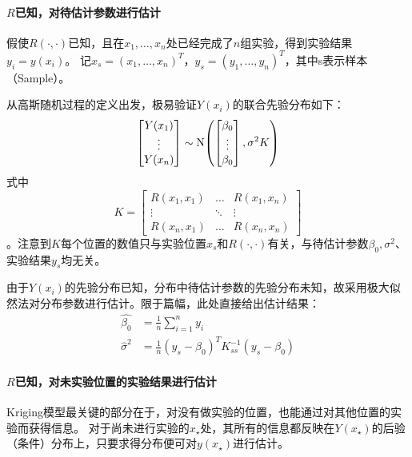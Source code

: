\documentclass[index]{subfiles}
\begin{document}
\paragraph{$R$已知，对待估计参数进行估计}
假使$R(\cdot, \cdot)$已知，且在$x_1,\ldots,x_n$处已经完成了$n$组实验，得到实验结果$y_i=y(x_i)$。
记$x_s=(x_1,\ldots,x_n)^T$，$y_s=(y_1,\ldots,y_n)^{T}$，其中s表示样本（Sample）。

从高斯随机过程的定义出发，极易验证$Y(x_i)$的联合先验分布如下：
\begin{equation}\label{equ:doe-kss-d}
  \begin{bmatrix} Y(x_1) \\ \vdots \\ Y(x_n) \end{bmatrix}
  \sim \operatorname{N}\!\left(
    \begin{bmatrix} \beta_0 \\ \vdots \\ \beta_0 \end{bmatrix}
  ,\sigma^2 K \right)
\end{equation}
式中
\begin{equation}\label{equ:doe-kss}
  K = \begin{bmatrix}
    R(x_1, x_1) & \ldots & R(x_1, x_n) \\
    \vdots & \ddots & \vdots \\
    R(x_n, x_1) & \ldots & R(x_n, x_n)
  \end{bmatrix}
\end{equation}
。注意到$K$每个位置的数值只与实验位置$x_s$和$R(\cdot, \cdot)$有关，与待估计参数$\beta_0,\sigma^2$、实验结果$y_s$均无关。

由于$Y(x_i)$的先验分布已知，分布中待估计参数的先验分布未知，故采用极大似然法对分布参数进行估计。限于篇幅，此处直接给出估计结果\cite{sacks1989}：
\begin{align}\label{equ:doe-par-est}
  \hat{\beta_0} &= \frac{1}{n} \sum_{i=1}^{n} y_i \\
  \hat{\sigma}^2 &= \frac{1}{n} (y_s - \beta_0)^T K_{ss}^{-1} (y_s - \beta_0)
\end{align}

\paragraph{$R$已知，对未实验位置的实验结果进行估计}
Kriging模型最关键的部分在于，对没有做实验的位置，也能通过对其他位置的实验而获得信息。
对于尚未进行实验的$x_\star$处，其所有的信息都反映在$Y(x_\star)$的后验（条件）分布上，只要求得分布便可对$y(x_\star)$进行估计。
\end{document}
